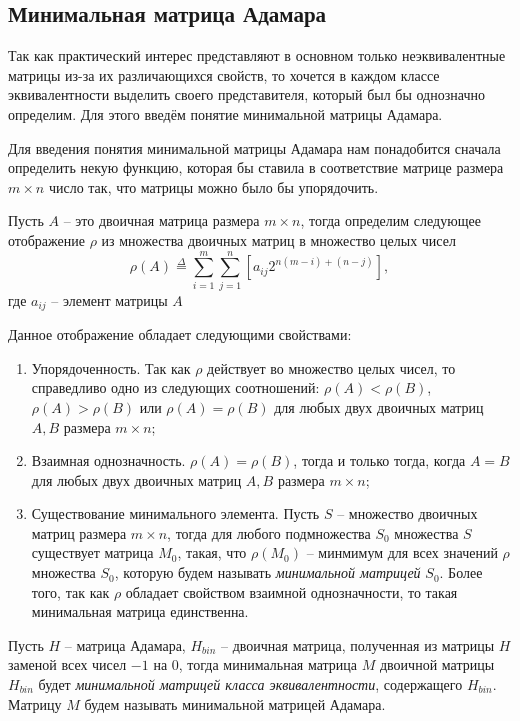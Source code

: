\documentclass[a4paper, 14pt]{extreport}
\begin{document}
\subsection{Минимальная матрица Адамара}

Так как практический интерес представляют в основном только неэквивалентные матрицы из-за их различающихся свойств, то хочется в каждом классе эквивалентности выделить своего представителя, который был бы однозначно определим. Для этого введём понятие минимальной матрицы Адамара.

Для введения понятия минимальной матрицы Адамара нам понадобится сначала определить некую функцию, которая бы ставила в соответствие матрице размера $m \times n$ число так, что матрицы можно было бы упорядочить.

\begin{Df}\normalfont\label{df:bin_map}
    Пусть $A$ -- это двоичная матрица размера $m \times n$, тогда определим следующее отображение $\rho$ из множества двоичных матриц в множество целых чисел
    \begin{equation}
        \rho(A) \overset{\Delta}{=} \sum_{i = 1}^m \sum_{j = 1}^n \left[a_{ij} 2^{n(m-i)+(n-j)}\right],
    \end{equation}
    где $a_{ij}$ -- элемент матрицы $A$
\end{Df}

Данное отображение обладает следующими свойствами:
\begin{enumerate}
    \item Упорядоченность. Так как $\rho$ действует во множество целых чисел, то справедливо одно из следующих соотношений: $\rho(A) < \rho(B)$, $\rho(A) > \rho(B)$ или $\rho(A) = \rho(B)$ для любых двух двоичных матриц $A, B$ размера $m \times n$;
    \item Взаимная однозначность. $\rho(A) = \rho(B)$, тогда и только тогда, когда $A = B$ для любых двух двоичных матриц $A, B$ размера $m \times n$;
    \item Существование минимального элемента. Пусть $S$ -- множество двоичных матриц размера $m \times n$, тогда для любого подмножества $S_0$ множества $S$ существует матрица $M_0$, такая, что $\rho(M_0)$ -- минмимум для всех значений $\rho$ множества $S_0$, которую будем называть {\it минимальной матрицей} $S_0$. Более того, так как $\rho$ обладает свойством взаимной однозначности, то такая минимальная матрица единственна.
\end{enumerate}

\begin{Df}\normalfont\label{df:min_had}
    Пусть $H$ -- матрица Адамара, $H_{bin}$ -- двоичная матрица, полученная из матрицы $H$ заменой всех чисел $-1$ на $0$, тогда минимальная матрица $M$ двоичной матрицы $H_{bin}$ будет {\it минимальной матрицей класса эквивалентности}, содержащего $H_{bin}$. Матрицу $M$ будем называть минимальной матрицей Адамара.
\end{Df}
\end{document}

